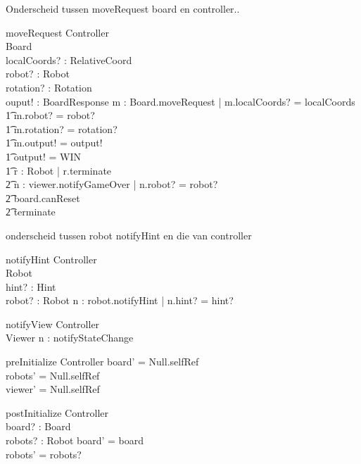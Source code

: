 \documentclass[a4paper,11pt]{article}
\begin{document}
Onderscheid tussen moveRequest board en controller..
\begin{schema}{moveRequest}
\Xi Controller \\
\Delta Board \\
localCoords? : RelativeCoord \\
robot? : Robot \\
rotation? : Rotation \\
ouput! : BoardResponse
\where
\exists m : Board.moveRequest | m.localCoords? = localCoords \\ \t1
m.robot? = robot? \\ \t1
m.rotation? = rotation? \\ \t1
m.output! = output! \\ \t1
\IF output! = WIN \\ \t1
\THEN \forall r : Robot | r.terminate \\ \t2
\exists n : viewer.notifyGameOver | n.robot? = robot? \\ \t2
board.canReset \\ \t2
terminate
\end{schema}

onderscheid tussen robot notifyHint en die van controller
\begin{schema}{notifyHint}
\Xi Controller \\
\Delta Robot \\
hint? : Hint \\
robot? : Robot
\where
\exists n : robot.notifyHint | n.hint? = hint?
\end{schema}

\begin{schema}{notifyView}
\Xi Controller \\
\Delta Viewer
\where
\exists n : notifyStateChange
\end{schema}

\begin{schema}{preInitialize}
\Delta Controller
\where
board' = Null.selfRef \\
robots' = Null.selfRef \\
viewer' = Null.selfRef
\end{schema}

\begin{schema}{postInitialize}
\Delta Controller \\
board? : Board \\
robots? : \power Robot 
\where
board' = board \\
robots' = robots?
\end{schema}
\end{document}

